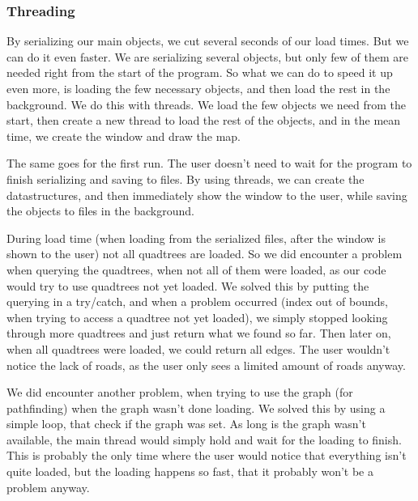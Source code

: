 \subsubsection{Threading}
By serializing our main objects, we cut several seconds of our load times. But we can do it
even faster. We are serializing several objects, but only few of them are needed right from
the start of the program. So what we can do to speed it up even more, is loading the few
necessary objects, and then load the rest in the background. We do this with threads.
We load the few objects we need from the start, then create a new thread to load the rest
of the objects, and in the mean time, we create the window and draw the map.

The same goes for the first run. The user doesn't need to wait for the program to finish
serializing and saving to files. By using threads, we can create the datastructures, and
then immediately show the window to the user, while saving the objects to files in the
background.

During load time (when loading from the serialized files, after the window is shown to the 
user) not all quadtrees are loaded. So we did encounter a problem when querying the 
quadtrees, when not all of them were loaded, as our code would try to use quadtrees 
not yet loaded. We solved this by putting the querying in a try/catch, and when a problem 
occurred (index out of bounds, when trying to access a quadtree not yet loaded), we simply 
stopped looking through more quadtrees and just return what we found so far. Then later on, 
when all quadtrees were loaded, we could return all edges. The user wouldn't notice the lack 
of roads, as the user only sees a limited amount of roads anyway.

We did encounter another problem, when trying to use the graph (for pathfinding) when the
graph wasn't done loading. We solved this by using a simple loop, that check if the graph was
set. As long is the graph wasn't available, the main thread would simply hold and wait for the
loading to finish. This is probably the only time where the user would notice that everything isn't
quite loaded, but the loading happens so fast, that it probably won't be a problem anyway.
